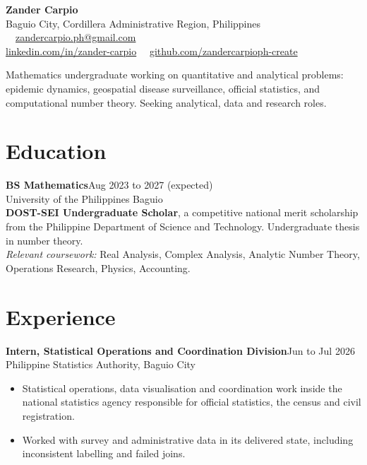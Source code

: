 \documentclass[10pt,a4paper]{article}
\newcommand{\entry}[3]{%
  \textbf{#1}\hfill{\small\textcolor{muted}{#3}}\\[1pt]
  {\small\textcolor{accent}{#2}}\\[2pt]
}
\begin{document}
{\LARGE\bfseries Zander Carpio}\\[5pt]
{\small\textcolor{muted}{
  Baguio City, Cordillera Administrative Region, Philippines \ \textbar\
  \href{mailto:zandercarpio.ph@gmail.com}{zandercarpio.ph@gmail.com}\\
  \href{https://www.linkedin.com/in/zander-carpio/}{linkedin.com/in/zander-carpio}
  \ \textbar\
  \href{https://github.com/zandercarpioph-create}{github.com/zandercarpioph-create}
}}

\vspace{9pt}
{\small
Mathematics undergraduate working on quantitative and analytical problems:
epidemic dynamics, geospatial disease surveillance, official statistics, and
computational number theory. Seeking analytical, data and research roles.
}

\section{Education}

\entry{BS Mathematics}{University of the Philippines Baguio}{Aug 2023 to 2027 (expected)}
{\small
\textbf{DOST-SEI Undergraduate Scholar}, a competitive national merit scholarship
from the Philippine Department of Science and Technology. Undergraduate thesis in
number theory.\\[2pt]
\textit{Relevant coursework:} Real Analysis, Complex Analysis, Analytic Number
Theory, Operations Research, Physics, Accounting.
}

\section{Experience}

\entry{Intern, Statistical Operations and Coordination Division}{Philippine Statistics Authority, Baguio City}{Jun to Jul 2026}
{\small
\begin{itemize}[leftmargin=12pt,itemsep=1pt,topsep=1pt]
  \item Statistical operations, data visualisation and coordination work inside
        the national statistics agency responsible for official statistics, the
        census and civil registration.
  \item Worked with survey and administrative data in its delivered state,
        including inconsistent labelling and failed joins.
\end{itemize}
}
\end{document}
